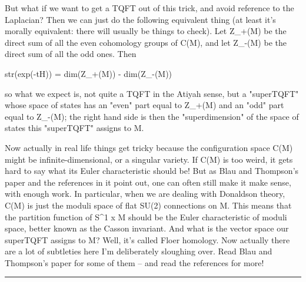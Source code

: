 But what if we want to get a TQFT out of this trick, and avoid 
reference to the Laplacian?  Then we can just do the following equivalent
thing (at least it's morally equivalent: there will usually be things to
check).  Let Z_{+}(M) 
be the direct sum of all the even cohomology groups of
C(M), and let Z_{-}(M) be the direct sum of all the odd ones.  Then

str(exp(-tH)) = dim(Z_{+}(M)) - dim(Z_{-}(M))

so what we expect is, not quite a TQFT in the Atiyah sense, but
a "superTQFT" whose space of states has an "even" part equal
to Z_{+}(M) and an "odd" part equal to Z_{-}(M); 
the right hand side is then the "superdimension" of the space of states this
"superTQFT" assigns to M.

Now actually in real life things get tricky because the configuration
space C(M) might be infinite-dimensional, or a singular variety.
If C(M) is too weird, it gets hard to say what its Euler characteristic
should be!  But as Blau and Thompson's paper and the references in it
point out, one can often still make it make sense, with enough work.
In particular, when we are dealing with Donaldson theory, C(M) is
just the moduli space of flat SU(2) connections on M.  This means
that the partition function of S^{1} x M should be the Euler 
characteristic 
of moduli space, better known as the Casson invariant.  And what is
the vector space our superTQFT assigns to M?  Well, it's called
Floer homology.  Now actually there are a lot of subtleties here
I'm deliberately sloughing over.  Read Blau and Thompson's paper
for some of them -- and read the references for more!


\par\noindent\rule{\textwidth}{0.4pt}


